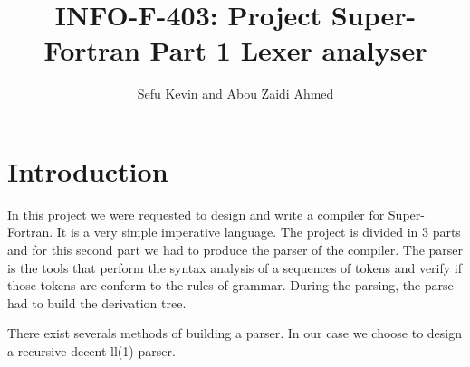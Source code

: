 \documentclass[12pt]{article}
\title{INFO-F-403: Project Super-Fortran Part 1 Lexer analyser}
\author{Sefu Kevin and Abou Zaidi Ahmed}
\begin{document}
\maketitle
\section{Introduction}
In this project we were requested to design and write a compiler for Super-Fortran. It is a very simple
imperative language. The project is divided in 3 parts and for this second part we had to produce
the parser of the compiler. The parser is the tools that perform the syntax analysis of a sequences of tokens and verify if
those tokens are conform to the rules of grammar. During the parsing, the parse had to build the derivation tree.

There exist severals methods of building a parser. In our case we choose to design a recursive decent ll(1) parser.
\end{document}
